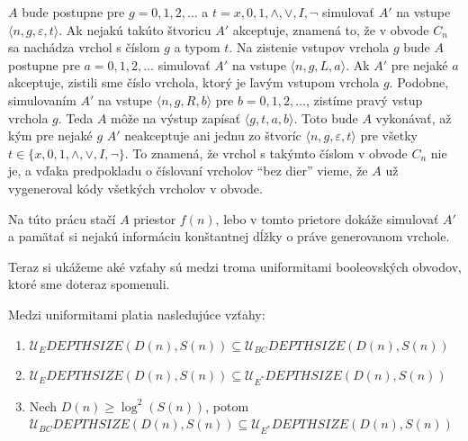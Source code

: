 {\begin{dokaz}
\begin{description}
  $A$ bude postupne pre $g=0,1,2,\dots$ a $t=x,0,1,\wedge,\vee,I,\neg$
  simulovať $A'$ na vstupe $\langle n,g,\varepsilon,t\rangle$. Ak
  nejakú takúto štvoricu $A'$ akceptuje, znamená to, že v obvode
  $C_n$ sa nachádza vrchol s číslom $g$ a typom $t$. Na zistenie
  vstupov vrchola $g$ bude $A$ postupne pre $a=0,1,2,\dots$ simulovať
  $A'$ na vstupe $\langle n,g,L,a\rangle$. Ak $A'$ pre nejaké $a$
  akceptuje, zistili sme číslo vrchola, ktorý je ľavým vstupom
  vrchola $g$. Podobne, simulovaním $A'$ na vstupe $\langle
  n,g,R,b\rangle$ pre $b=0,1,2,\dots$, zistíme pravý vstup vrchola
  $g$. Teda $A$ môže na výstup zapísať $\langle g,t,a,b\rangle$.
  Toto bude $A$ vykonávať, až kým pre nejaké $g$ $A'$ neakceptuje
  ani jednu zo štvoríc $\langle n,g,\varepsilon,t\rangle$ pre
  všetky $t\in\{ x,0,1,\wedge,\vee,I,\neg\} $. To znamená, že vrchol s takýmto
  číslom v obvode $C_n$ nie je, a vďaka predpokladu o číslovaní
  vrcholov ``bez dier'' vieme, že $A$ už vygeneroval kódy všetkých
  vrcholov v obvode.

  Na túto prácu stačí $A$ priestor $f(n)$, lebo v tomto prietore
  dokáže simulovať $A'$ a pamätať si nejakú informáciu konštantnej
  dĺžky o práve generovanom vrchole.
\end{description}
\end{dokaz}

Teraz si ukážeme aké vzťahy sú medzi troma uniformitami
booleovských obvodov, ktoré sme doteraz spomenuli.

\begin{veta}
Medzi uniformitami platia nasledujúce vzťahy:
\begin{enumerate}
  \item $\mathcal{U}_E DEPTHSIZE(D(n),S(n))\subseteq\mathcal{U}_{BC}
  DEPTHSIZE(D(n),S(n))$
  \item $\mathcal{U}_E DEPTHSIZE(D(n),S(n))\subseteq\mathcal{U}_{E^*}
  DEPTHSIZE(D(n),S(n))$
  \item Nech $D(n)\geq\log^2 (S(n))$, potom\newline
  $\mathcal{U}_{BC} DEPTHSIZE(D(n),S(n))\subseteq\mathcal{U}_{E^*}
  DEPTHSIZE(D(n),S(n))$
\end{enumerate}
\end{veta}

}
